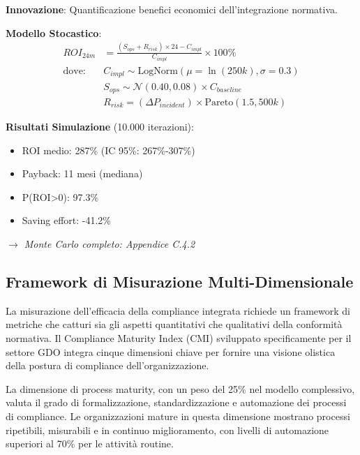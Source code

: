 \begin{tcolorbox}[
    colback=cyan!5!white,
    colframe=cyan!65!black,
    title={\textbf{Innovation Box 4.2:} Modello ROI per Compliance Integrata},
    fonttitle=\bfseries,
    boxrule=1.5pt,
    arc=2mm
]
\textbf{Innovazione}: Quantificazione benefici economici dell'integrazione normativa.

\vspace{0.3cm}
\textbf{Modello Stocastico}:
\begin{align*}
ROI_{24m} &= \frac{(S_{ops} + R_{risk}) \times 24 - C_{impl}}{C_{impl}} \times 100\% \\
\text{dove:} \quad & C_{impl} \sim \text{LogNorm}(\mu=\ln(250k), \sigma=0.3) \\
& S_{ops} \sim \mathcal{N}(0.40, 0.08) \times C_{baseline} \\
& R_{risk} = (\Delta P_{incident}) \times \text{Pareto}(1.5, 500k)
\end{align*}

\vspace{0.3cm}
\textbf{Risultati Simulazione} (10.000 iterazioni):
\begin{itemize}%
    \item ROI medio: 287\% (IC 95\%: 267\%-307\%)
    \item Payback: 11 mesi (mediana)
    \item P(ROI>0): 97.3\%
    \item Saving effort: -41.2\%
\end{itemize}

\textit{$\rightarrow$ Monte Carlo completo: Appendice C.4.2}
\end{tcolorbox}

\subsection{Framework di Misurazione Multi-Dimensionale}

La misurazione dell'efficacia della compliance integrata richiede un framework di metriche che catturi sia gli aspetti quantitativi che qualitativi della conformità normativa. Il Compliance Maturity Index (CMI) sviluppato specificamente per il settore GDO integra cinque dimensioni chiave per fornire una visione olistica della postura di compliance dell'organizzazione.

La dimensione di process maturity, con un peso del 25\% nel modello complessivo, valuta il grado di formalizzazione, standardizzazione e automazione dei processi di compliance. Le organizzazioni mature in questa dimensione mostrano processi ripetibili, misurabili e in continuo miglioramento, con livelli di automazione superiori al 70\% per le attività routine.

